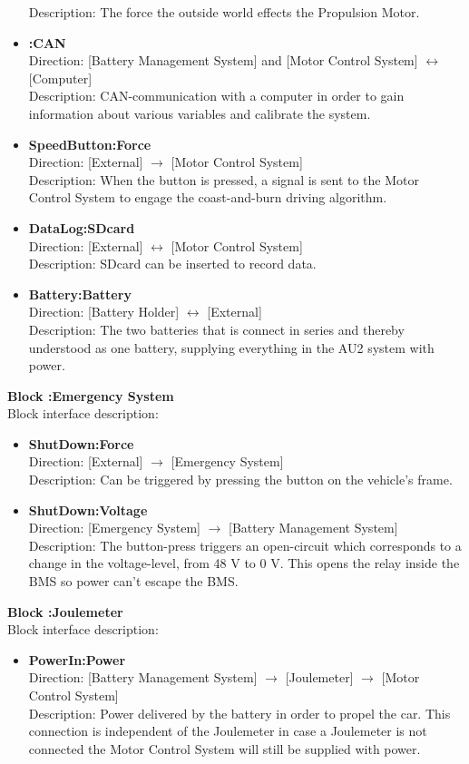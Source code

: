 \begin{itemize}
	Description: The force the outside world effects the Propulsion Motor.
	\item \textbf{:CAN}\\
	Direction: [Battery Management System] and [Motor Control System] $\leftrightarrow$ [Computer]\\
	Description: CAN-communication with a computer in order to gain information about various variables and calibrate the system.
	\item \textbf{SpeedButton:Force}\\
	Direction: [External] $\rightarrow$ [Motor Control System]\\
	Description: When the button is pressed, a signal is sent to the Motor Control System to engage the coast-and-burn driving algorithm. 
	\item \textbf{DataLog:SDcard}\\
	Direction: [External] $\leftrightarrow$ [Motor Control System]\\
	Description: SDcard can be inserted to record data.
	\item \textbf{Battery:Battery}\\
	Direction: [Battery Holder] $\leftrightarrow$ [External]\\
	Description: The two batteries that is connect in series and thereby understood as one battery, supplying everything in the AU2 system with power.
\end{itemize}

\textbf{Block :Emergency System}\\
Block interface description:
\begin{itemize}
	\item \textbf{ShutDown:Force}\\
	Direction: [External] $\rightarrow$ [Emergency System]\\
	Description: Can be triggered by pressing the button on the vehicle's frame.
	\item \textbf{ShutDown:Voltage}\\
	Direction: [Emergency System] $\rightarrow$ [Battery Management System]\\
	Description: The button-press triggers an open-circuit which corresponds to a change in the voltage-level, from 48 V to 0 V. This opens the relay inside the BMS so power can't escape the BMS.
\end{itemize}

\textbf{Block :Joulemeter}\\
Block interface description:
\begin{itemize}
	\item \textbf{PowerIn:Power}\\
	Direction: [Battery Management System] $\rightarrow$ [Joulemeter] $\rightarrow$ [Motor Control System]\\
	Description: Power delivered by the battery in order to propel the car. This connection is independent of the Joulemeter in case a Joulemeter is not connected the Motor Control System will still be supplied with power.
\end{itemize}

